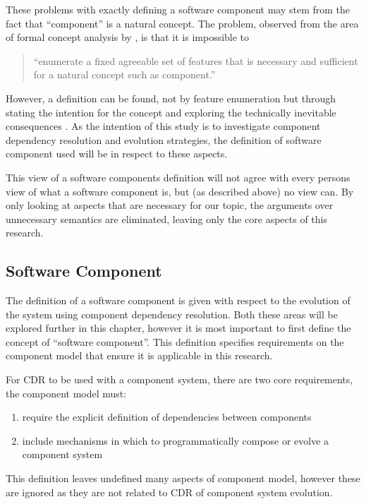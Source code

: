 These problems with exactly defining a software component may stem from the fact that ``component'' is a natural concept.
The problem, observed from the area of formal concept analysis \cite{Ganter1999} by \cite{Szyperski2002}, is that it is impossible to

\begin{quotation} 
``enumerate a fixed agreeable set of features that is necessary and sufficient for a natural concept such as component.'' 
\end{quotation}

However, a definition can be found, not by feature enumeration but through stating the intention for the concept and exploring the technically inevitable consequences \cite{Szyperski2002}. 
As the intention of this study is to investigate component dependency resolution and evolution strategies,
the definition of software component used will be in respect to these aspects.

This view of a software components definition will not agree with every persons view of what a software component is, but (as described above) no view can.
By only looking at aspects that are necessary for our topic, the arguments over unnecessary semantics are eliminated, leaving only the core aspects of this research. 

\subsection{Software Component}
The definition of a software component is given with respect to the evolution of the system using component dependency resolution.
Both these areas will be explored further in this chapter, however it is most important to first define the concept of ``software component''.
This definition specifies requirements on the component model that ensure it is applicable in this research.

For CDR to be used with a component system, there are two core requirements, the component model must:
\begin{enumerate}
  \item require the explicit definition of dependencies between components
  \item include mechanisms in which to programmatically compose or evolve a component system
\end{enumerate}
This definition leaves undefined many aspects of component model, however these are ignored as they are not related to CDR of component system evolution.

